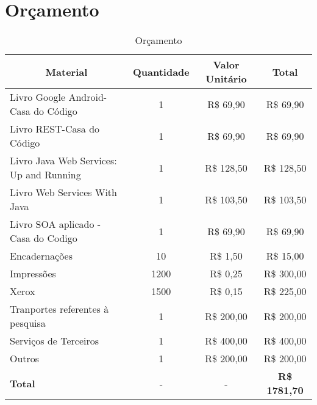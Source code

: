 \section{Orçamento}
\begin{table} [h]
  \caption[Orçamento]
          {Orçamento}
  \centering
  \begin{small}
  \setlength{\tabcolsep}{1pt}
  \begin{tabular}{|p{3.5in}|c|c|c|}
    \hline 
    \multicolumn{1}{|c|}{\textbf{Material}} & 
    \multicolumn{1}{c|}{\textbf{Quantidade}} &
    \multicolumn{1}{c|}{\textbf{Valor Unitário}} &
    \multicolumn{1}{c|}{\textbf{Total}}\\\hline\hline 
    
    Livro Google Android-Casa do Código &1 &R\$ 69,90 &R\$ 69,90 \\\hline
    
    Livro REST-Casa do Código &1 &R\$ 69,90 &R\$ 69,90 \\\hline
    
    Livro Java Web Services: Up and Running   &1   &R\$ 128,50 &R\$ 128,50 \\\hline
    
    Livro Web Services With Java   &1   &R\$ 103,50 &R\$ 103,50 \\\hline
    
    Livro SOA aplicado - Casa do Codigo  &1   &R\$ 69,90 &R\$ 69,90 \\\hline 
    
    Encadernações &10   &R\$ 1,50 &R\$ 15,00 \\\hline
    
    Impressões            &1200  &R\$ 0,25 &R\$ 300,00 \\\hline
    
    Xerox &1500  &R\$ 0,15 &R\$ 225,00 \\\hline
    
    Tranportes referentes à pesquisa &1  &R\$ 200,00 &R\$ 200,00 \\\hline
    
    Serviços de Terceiros &1  &R\$ 400,00 &R\$ 400,00 \\\hline
    
    Outros &1  &R\$ 200,00 &R\$ 200,00 \\\hline
    
    \textbf{Total}        &-   &-         &\textbf{R\$ 1781,70} \\\hline
    
  \end{tabular}
  \end{small}
  
\end{table}